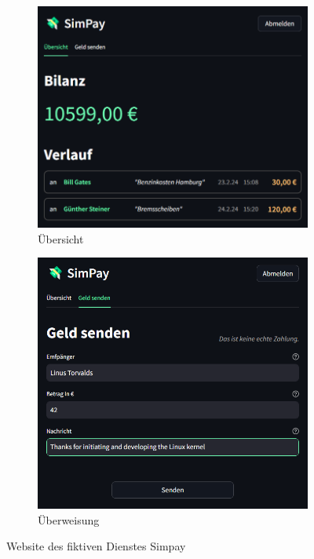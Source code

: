 \begin{figure}
    \centering
    \begin{subfigure}{.5\textwidth}
      \centering
      \includegraphics[width=.95\linewidth]{figures/impl/simpay_bilanz.png}
      \caption{Übersicht}
    \end{subfigure}%
    \begin{subfigure}{.5\textwidth}
      \centering
      \includegraphics[width=.95\linewidth]{figures/impl/simpay_send.png}
      \caption{Überweisung}
    \end{subfigure}
    \caption[Website des fiktiven Dienstes Simpay]{Website des fiktiven Dienstes Simpay}
    \label{fig: simpay}
\end{figure}
